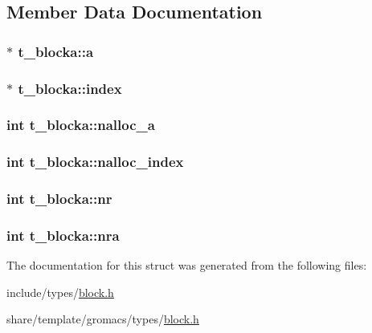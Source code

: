 \subsection{\-Member \-Data \-Documentation}
\hypertarget{structt__blocka_a16498d1da158bcdc790dea70dce35d92}{
\subsubsection[{a}]{ $\ast$ {\bf t\-\_\-blocka\-::a}}}\label{structt__blocka_a16498d1da158bcdc790dea70dce35d92}
\hypertarget{structt__blocka_ac7dc8132d0ccd9b599a26160b5a15a2e}{
\subsubsection[{index}]{ $\ast$ {\bf t\-\_\-blocka\-::index}}}\label{structt__blocka_ac7dc8132d0ccd9b599a26160b5a15a2e}
\hypertarget{structt__blocka_acf9ea36552f1a02b2a54246de5314829}{
\subsubsection[{nalloc\-\_\-a}]{\setlength{\rightskip}{0pt plus 5cm}int {\bf t\-\_\-blocka\-::nalloc\-\_\-a}}}\label{structt__blocka_acf9ea36552f1a02b2a54246de5314829}
\hypertarget{structt__blocka_a897adece5ffeebfb2ce39a18f4fe374e}{
\subsubsection[{nalloc\-\_\-index}]{\setlength{\rightskip}{0pt plus 5cm}int {\bf t\-\_\-blocka\-::nalloc\-\_\-index}}}\label{structt__blocka_a897adece5ffeebfb2ce39a18f4fe374e}
\hypertarget{structt__blocka_a8e908831b35eb89913fb4bab91192b7a}{
\subsubsection[{nr}]{\setlength{\rightskip}{0pt plus 5cm}int {\bf t\-\_\-blocka\-::nr}}}\label{structt__blocka_a8e908831b35eb89913fb4bab91192b7a}
\hypertarget{structt__blocka_ae02c2b24080a9ba80fc71202c236c88b}{
\subsubsection[{nra}]{\setlength{\rightskip}{0pt plus 5cm}int {\bf t\-\_\-blocka\-::nra}}}\label{structt__blocka_ae02c2b24080a9ba80fc71202c236c88b}


\-The documentation for this struct was generated from the following files\-:\begin{DoxyCompactItemize}
\item 
include/types/\hyperlink{include_2types_2block_8h}{block.\-h}\item 
share/template/gromacs/types/\hyperlink{share_2template_2gromacs_2types_2block_8h}{block.\-h}\end{DoxyCompactItemize}

